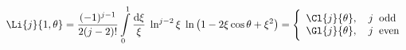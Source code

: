 \begin{equation}
\Li{j}{1,\theta} =
\frac{(-1)^{j-1}}{2(j-2)!}\int\limits_0^1
\frac{{\rm d}\xi}{\xi}\; \ln^{j-2}\xi\; 
\ln\left(1-2\xi\cos\theta+\xi^2\right)
=
\Biggl\{
\begin{array}{l}
\Cl{j}{\theta}, \quad j\;\;{\rm odd}\\
\Gl{j}{\theta}, \quad j\;\;{\rm even}
\end{array}
\end{equation}

